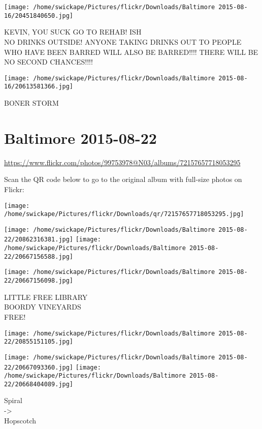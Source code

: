 \documentclass[10pt,letterpaper]{article}
\begin{document}
\vspace{0.25in}
\texttt{[image: /home/swickape/Pictures/flickr/Downloads/Baltimore 2015-08-16/20451840650.jpg]}

KEVIN, YOU SUCK GO TO REHAB! ISH\\
NO DRINKS OUTSIDE!  ANYONE TAKING DRINKS OUT TO PEOPLE WHO HAVE BEEN BARRED WILL ALSO BE BARRED!!!! THERE WILL BE NO SECOND CHANCES!!!!
\pagebreak

\texttt{[image: /home/swickape/Pictures/flickr/Downloads/Baltimore 2015-08-16/20613581366.jpg]}

BONER STORM
\pagebreak

\section*{Baltimore 2015-08-22}

\url{https://www.flickr.com/photos/99753978@N03/albums/72157657718053295}

Scan the QR code below to go to the original album with full-size photos on Flickr:

\texttt{[image: /home/swickape/Pictures/flickr/Downloads/qr/72157657718053295.jpg]}
\pagebreak

\texttt{[image: /home/swickape/Pictures/flickr/Downloads/Baltimore 2015-08-22/20862316381.jpg]}
\texttt{[image: /home/swickape/Pictures/flickr/Downloads/Baltimore 2015-08-22/20667156588.jpg]}

\vspace{0.25in}
\texttt{[image: /home/swickape/Pictures/flickr/Downloads/Baltimore 2015-08-22/20667156098.jpg]}

LITTLE FREE LIBRARY\\
BOORDY VINEYARDS\\
FREE!
\pagebreak

\texttt{[image: /home/swickape/Pictures/flickr/Downloads/Baltimore 2015-08-22/20855151105.jpg]}

\vspace{0.25in}
\texttt{[image: /home/swickape/Pictures/flickr/Downloads/Baltimore 2015-08-22/20667093360.jpg]}
\texttt{[image: /home/swickape/Pictures/flickr/Downloads/Baltimore 2015-08-22/20668404089.jpg]}

Spiral\\
{-}>\\
Hopscotch
\pagebreak
\end{document}
